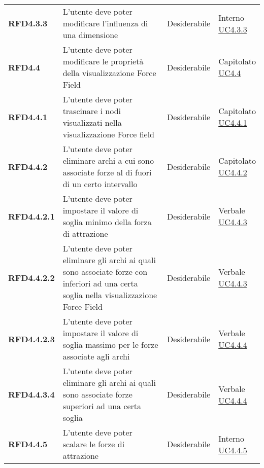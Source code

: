 \begin{longtable}[H]{| >{\raggedright\bfseries}m{20mm} | >{\raggedright}m{90mm} | >{\centering}m{25mm} | >{\centering\arraybackslash}m{30mm}|}
    RFD4.3.3
    & L'utente deve poter modificare l'influenza di una dimensione
    & Desiderabile
    & \makecell{ Interno \\ \hyperref[par:uc4.3.3]{UC4.3.3} }\\

    RFD4.4
    & L'utente deve poter modificare le proprietà della visualizzazione Force Field
    & Desiderabile
    & \makecell{ Capitolato \\ \hyperref[ssub:uc4.4]{UC4.4} }\\

    RFD4.4.1
    & L'utente deve poter trascinare i nodi visualizzati nella visualizzazione Force field
    & Desiderabile
    & \makecell{ Capitolato \\ \hyperref[par:uc4.4.1]{UC4.4.1} }\\

    RFD4.4.2
    & L'utente deve poter eliminare archi a cui sono associate forze al di fuori di un certo intervallo
    & Desiderabile
    & \makecell{ Capitolato \\ \hyperref[par:uc4.4.2]{UC4.4.2} }\\

    RFD4.4.2.1
    & L'utente deve poter impostare il valore di soglia minimo della forza di attrazione
    & Desiderabile
    & \makecell{ Verbale \\ \hyperref[par:uc4.4.3]{UC4.4.3} }\\

    RFD4.4.2.2
    & L'utente deve poter eliminare gli archi ai quali sono associate forze con inferiori ad una certa soglia
    nella visualizzazione Force Field
    & Desiderabile
    & \makecell{ Verbale \\ \hyperref[par:uc4.4.3]{UC4.4.3} }\\


    RFD4.4.2.3
    & L'utente deve poter impostare il valore di soglia massimo per le forze associate agli archi
    & Desiderabile
    & \makecell{ Verbale \\ \hyperref[par:uc4.4.4]{UC4.4.4} }\\

    RFD4.4.3.4
    & L'utente deve poter eliminare gli archi ai quali sono associate forze superiori ad una certa soglia
    & Desiderabile
    & \makecell{ Verbale \\ \hyperref[par:uc4.4.4]{UC4.4.4} }\\

    RFD4.4.5
    & L'utente deve poter scalare le forze di attrazione
    & Desiderabile
    & \makecell{ Interno \\ \hyperref[par:uc4.4.5]{UC4.4.5} }\\


\end{longtable}
